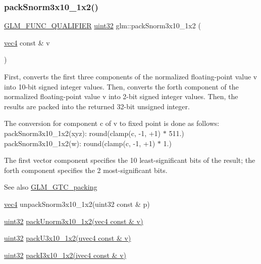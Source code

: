 \subsubsection{\texorpdfstring{pack\+Snorm3x10\+\_\+1x2()}{packSnorm3x10\_1x2()}}
{\footnotesize\ttfamily \hyperlink{setup_8hpp_a33fdea6f91c5f834105f7415e2a64407}{G\+L\+M\+\_\+\+F\+U\+N\+C\+\_\+\+Q\+U\+A\+L\+I\+F\+I\+ER} \hyperlink{group__gtc__type__precision_ga202b6a53c105fcb7e531f9b443518451}{uint32} glm\+::pack\+Snorm3x10\+\_\+1x2 (\begin{DoxyParamCaption}\item[{\hyperlink{group__core__types_ga5881b1b022d7fd1b7218f5916532dd02}{vec4} const \&}]{v }\end{DoxyParamCaption})}

First, converts the first three components of the normalized floating-\/point value v into 10-\/bit signed integer values. Then, converts the forth component of the normalized floating-\/point value v into 2-\/bit signed integer values. Then, the results are packed into the returned 32-\/bit unsigned integer.

The conversion for component c of v to fixed point is done as follows\+: pack\+Snorm3x10\+\_\+1x2(xyz)\+: round(clamp(c, -\/1, +1) $\ast$ 511.) pack\+Snorm3x10\+\_\+1x2(w)\+: round(clamp(c, -\/1, +1) $\ast$ 1.)

The first vector component specifies the 10 least-\/significant bits of the result; the forth component specifies the 2 most-\/significant bits.

\begin{DoxySeeAlso}{See also}
\hyperlink{group__gtc__packing}{G\+L\+M\+\_\+\+G\+T\+C\+\_\+packing} 

\hyperlink{group__core__types_ga5881b1b022d7fd1b7218f5916532dd02}{vec4} unpack\+Snorm3x10\+\_\+1x2(uint32 const \& p) 

\hyperlink{group__gtc__type__precision_ga202b6a53c105fcb7e531f9b443518451}{uint32} \hyperlink{group__gtc__packing_ga2cf2d11b40bd48639110456fd74c2e33}{pack\+Unorm3x10\+\_\+1x2(vec4 const \& v)} 

\hyperlink{group__gtc__type__precision_ga202b6a53c105fcb7e531f9b443518451}{uint32} \hyperlink{group__gtc__packing_gaf656d8862628f96b20de7a36eaa1fe56}{pack\+U3x10\+\_\+1x2(uvec4 const \& v)} 

\hyperlink{group__gtc__type__precision_ga202b6a53c105fcb7e531f9b443518451}{uint32} \hyperlink{group__gtc__packing_ga032e18fa5bc5b8f3897104aeb2f1e195}{pack\+I3x10\+\_\+1x2(ivec4 const \& v)} 
\end{DoxySeeAlso}


